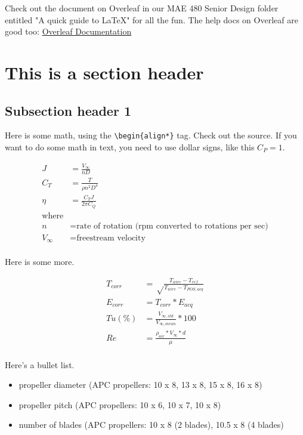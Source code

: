 \documentclass[]{aiaa-tc}%
\begin{document}
Check out the document on Overleaf in our MAE 480 Senior Design folder entitled "A quick guide to LaTeX" for all the fun.  The help docs on Overleaf are good too: \href{https://www.overleaf.com/learn/latex/Main_Page}{Overleaf Documentation}\\
\bigskip


\section{This is a section header}

\subsection{Subsection header 1}

Here is some math, using the \verb!\begin{align*}! tag.  Check out the source.  If you want to do some math in text, you need to use dollar signs, like this $C_{P}=1$.

\begin{align*}
	J &= \frac{V_{\infty}}{nD} \\
	C_{T} &= \frac{T}{\rho n^{2} D^{4}} \\
	\eta &= \frac{C_{T}J}{2\pi C_{Q}} \\
	\text{where}\\
	n &= \text{rate of rotation (rpm converted to rotations per sec)}\\
	V_{\infty} &= \text{freestream velocity}\\
\end{align*}

Here is some more.

\begin{align*}
	T_{corr} &= \sqrt\frac{T_{wire} - T_{ref}}{T_{wire} - T_{POS,acq}}\\
	E_{corr} &= T_{corr}*E_{acq}\\
	Tu (\%) &= \frac{V_{\infty,std}}{V_{\infty,mean}}*100\\
	Re &= \frac{\rho_{air}*V_{\infty}*d}{\mu}\\
\end{align*}

Here's a bullet list.\\
\begin{itemize}
	\item propeller diameter (APC propellers: 10 x 8, 13 x 8, 15 x 8, 16 x 8)
	\item propeller pitch (APC propellers: 10 x 6, 10 x 7, 10 x 8)
	\item number of blades (APC propellers: 10 x 8 (2 blades), 10.5 x 8 (4 blades)
\end{itemize}
\end{document}
